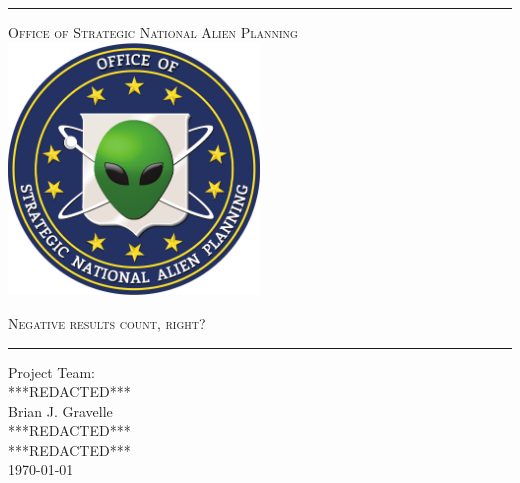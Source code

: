 \begin{titlepage}
\begin{center}

\rule{\linewidth}{0.5mm}

\textsc{\large Office of Strategic National Alien Planning}
~\\[1cm]
\includegraphics[width=0.5\textwidth]{./osnap_logo.pdf}~\\[1cm]

{\Huge \linespread{2}}

\textsc{\large Negative results count, right?}

\vspace{10pt}

\rule{\linewidth}{0.5mm}

\vfill

Project Team:\\
***REDACTED***\\
Brian J. Gravelle\\
***REDACTED***\\
***REDACTED***\\

\vfill
{\large \today}

\end{center}
\end{titlepage}
